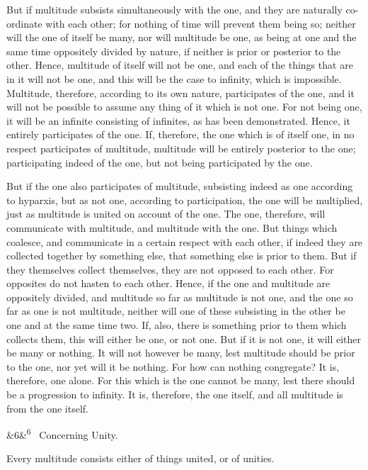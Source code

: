 \documentclass[12pt]{article}
\newcommand{\para}[1][]{\par\noindent\ifx&#1&\else\textsuperscript{\footnotesize #1}~\fi}
\begin{document}
But if multitude subsists simultaneously with the one, and they are naturally co-ordinate with each other; for nothing of time will prevent them being so; neither will the one of itself be many, nor will multitude be one, as being at one and the same time oppositely divided by nature, if neither is prior or posterior to the other. Hence, multitude of itself will not be one, and each of the things that are in it will not be one, and this will be the case to infinity, which is impossible. Multitude, therefore, according to its own nature, participates of the one, and it will not be possible to assume any thing of it which is not one. For not being one, it will be an infinite consisting of infinites, as has been demonstrated. Hence, it entirely participates of the one. If, therefore, the one which is of itself one, in no respect participates of multitude, multitude will be entirely posterior to the one; participating indeed of the one, but not being participated by the one.

But if the one also participates of multitude, subsisting indeed as one according to hyparxis, but as not one, according to participation, the one will be multiplied, just as multitude is united on account of the one. The one, therefore, will communicate with multitude, and multitude with the one. But things which coalesce, and communicate in a certain respect with each other, if indeed they are collected together by something else, that something else is prior to them. But if they themselves collect themselves, they are not opposed to each other. For opposites do not hasten to each other. Hence, if the one and multitude are oppositely divided, and multitude so far as multitude is not one, and the one so far as one is not multitude, neither will one of these subsisting in the other be one and at the same time two. If, also, there is something prior to them which collects them, this will either be one, or not one. But if it is not one, it will either be many or nothing. It will not however be many, lest multitude should be prior to the one, nor yet will it be nothing. For how can nothing congregate? It is, therefore, one alone. For this which is the one cannot be many, lest there should be a progression to infinity. It is, therefore, the one itself, and all multitude is from the one itself.

\para[6] Concerning Unity.

Every multitude consists either of things united, or of unities.
\end{document}
